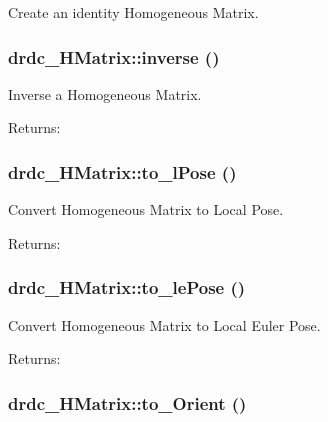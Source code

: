 Create an identity Homogeneous Matrix. 

\hypertarget{classdrdc__HMatrix_315a6b078d1d53eae992c70ec21fc1c4}{
\subsubsection[inverse]{ drdc\_\-HMatrix::inverse ()}}
\label{classdrdc__HMatrix_315a6b078d1d53eae992c70ec21fc1c4}


Inverse a Homogeneous Matrix. 

\begin{Desc}
\item[Returns:]\end{Desc}
\hypertarget{classdrdc__HMatrix_dba5a3f501e9831e97bd18c1857b84d9}{
\subsubsection[to\_\-lPose]{ drdc\_\-HMatrix::to\_\-lPose ()}}
\label{classdrdc__HMatrix_dba5a3f501e9831e97bd18c1857b84d9}


Convert Homogeneous Matrix to Local Pose. 

\begin{Desc}
\item[Returns:]\end{Desc}
\hypertarget{classdrdc__HMatrix_d87777199dadee62fbd5508956ab14b8}{
\subsubsection[to\_\-lePose]{ drdc\_\-HMatrix::to\_\-lePose ()}}
\label{classdrdc__HMatrix_d87777199dadee62fbd5508956ab14b8}


Convert Homogeneous Matrix to Local Euler Pose. 

\begin{Desc}
\item[Returns:]\end{Desc}
\hypertarget{classdrdc__HMatrix_07a66bec680b8e525741a89d85fa766a}{
\subsubsection[to\_\-Orient]{ drdc\_\-HMatrix::to\_\-Orient ()}}
\label{classdrdc__HMatrix_07a66bec680b8e525741a89d85fa766a}


